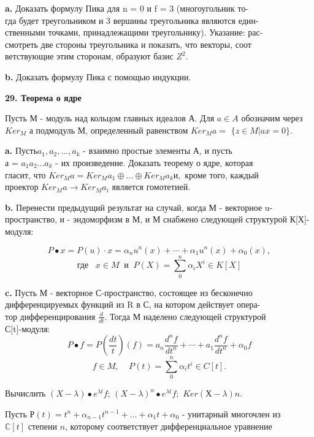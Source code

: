 \documentclass{../template/mai_book}
\begin{document}
{\bf a.} Доказать формулу Пика для n = 0 и f = 3 (многоугольник 
то-\\гда будет треугольником и 3 вершины треугольника являются 
един-\\ственными точками, принадлежащими треугольнику). Указание: 
рас-\\смотреть две стороны треугольника и показать, что векторы, 
соот\\ветствующие этим сторонам, образуют базис $Z^2$. 

{\bf b.} Доказать формулу Пика с помощью индукции.

{\noindent\bf29. Теорема о ядре} 

Пусть М - модуль над кольцом главных идеалов А. Для $a \in A$ 
обозначим через $Ker_M$ а подмодуль М, определенный равенством $Ker_M a =$ 
$ \{z \in M| ax=0\} $. 

{\bf a.} Пусть$a_1,a_2,...,a_k$ - взаимно простые элементы А, и пусть \\
а = $a_1a_2... a_k$ - их произведение. Доказать теорему о ядре, которая\\ 
гласит, что  $Ker_M a = Ker_M a_1 \oplus...\oplus Ker_M a_k и,$ кроме того, каждый\\ 
проектор $Ker_Ma \to Ker_M a_i $ является гомотетией. 

{\bf b.} Перенести предыдущий результат на случай, когда М - 
векторное u-пространство, и - эндоморфизм в М, и М снабжено следующей 
структурой К[Х]-модуля: 

$$ P\bullet x=P(u)\cdot x = \alpha_nu^n(x)+\cdots+\alpha_1u^n(x)+\alpha_0(x), $$
$$\displaystyle \text{где}\;\;\;x\in M\;\; \text{и}\;\;  P(X) = \sum^n_0\alpha_iX^i\in K[X] $$

{\bf c.} Пусть М - векторное С-пространство, состоящее из бесконечно\\ 
дифференцируемых функций из R в С, на котором действует 
опера-\\тор дифференцирования $\frac{d}{dt}$. Тогда М наделено следующей структурой\\ 
С[t]-модуля: 
$$ P\bullet f=P(\frac{dt}{t})(f)=a_n\frac{d^nf}{dt^n}+\cdots+a_1\frac{d^nf}{dt^n}+\alpha_0f$$
$$\displaystyle f \in M,\;\;\;\;P(t)=\sum^n_0\alpha_it^i\in C[t]. $$

\pagebreak

Вычислить $(X - \lambda) \bullet e^{\lambda t}f$; $(X - \lambda)^n \bullet e^{\lambda t}f;$ $Ker (Х - \lambda)n.$

\medskip

Пусть $Р(t) = t^n+\alpha_{n-1}t^{n-1}+...+\alpha_1t+\alpha_0$ - унитарный многочлен из \\
$\mathbb{C}[t]$ степени $n$, которому соответствует дифференциальное уравнение 
\end{document}
